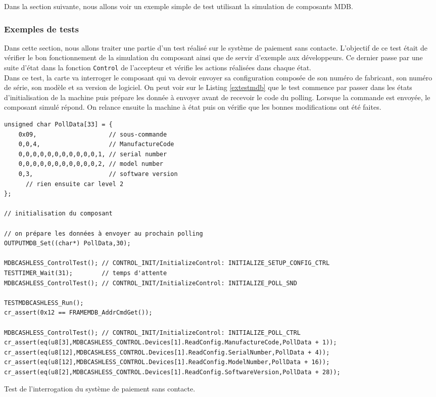 \documentclass[a4paper]{article}
\begin{document}
Dans la section suivante, nous allons voir un exemple simple de test
utilisant la simulation de composants MDB.

\subsubsection{Exemples de tests}

Dans cette section, nous allons traiter une partie d'un test réalisé sur le
système de paiement sans contacte. L'objectif de ce test était de vérifier le
bon fonctionnement de la simulation du composant ainsi que de servir d'exemple
aux développeurs. Ce dernier passe par une suite d'état dans la fonction
\verb|Control| de l'accepteur et vérifie les actions réalisées dans chaque
état.\\

Dans ce test, la carte va interroger le composant qui va devoir envoyer sa
configuration composée de son numéro de fabricant, son numéro de série, son
modèle et sa version de logiciel. On peut voir sur le Listing \ref{extestmdb}
que le test commence par passer dans les états d'initialisation de la machine
puis prépare les donnée à envoyer avant de recevoir le code du polling. Lorsque
la commande est envoyée, le composant simulé répond. On relance ensuite la
machine à état puis on vérifie que les bonnes modifications ont été faites.

\begin{listing}[ht!]
\begin{verbatim}
unsigned char PollData[33] = {
    0x09,                    // sous-commande
    0,0,4,                   // ManufactureCode
    0,0,0,0,0,0,0,0,0,0,0,1, // serial number
    0,0,0,0,0,0,0,0,0,0,0,2, // model number
    0,3,                     // software version
      // rien ensuite car level 2
};

// initialisation du composant

// on prépare les données à envoyer au prochain polling
OUTPUTMDB_Set((char*) PollData,30);

MDBCASHLESS_ControlTest(); // CONTROL_INIT/InitializeControl: INITIALIZE_SETUP_CONFIG_CTRL
TESTTIMER_Wait(31);        // temps d'attente
MDBCASHLESS_ControlTest(); // CONTROL_INIT/InitializeControl: INITIALIZE_POLL_SND

TESTMDBCASHLESS_Run();
cr_assert(0x12 == FRAMEMDB_AddrCmdGet());

MDBCASHLESS_ControlTest(); // CONTROL_INIT/InitializeControl: INITIALIZE_POLL_CTRL
cr_assert(eq(u8[3],MDBCASHLESS_CONTROL.Devices[1].ReadConfig.ManufactureCode,PollData + 1));
cr_assert(eq(u8[12],MDBCASHLESS_CONTROL.Devices[1].ReadConfig.SerialNumber,PollData + 4));
cr_assert(eq(u8[12],MDBCASHLESS_CONTROL.Devices[1].ReadConfig.ModelNumber,PollData + 16));
cr_assert(eq(u8[2],MDBCASHLESS_CONTROL.Devices[1].ReadConfig.SoftwareVersion,PollData + 28));
\end{verbatim}
\caption{Test de l'interrogation du système de paiement sans contacte.}
\label{extestmdb}
\end{listing}
\end{document}
